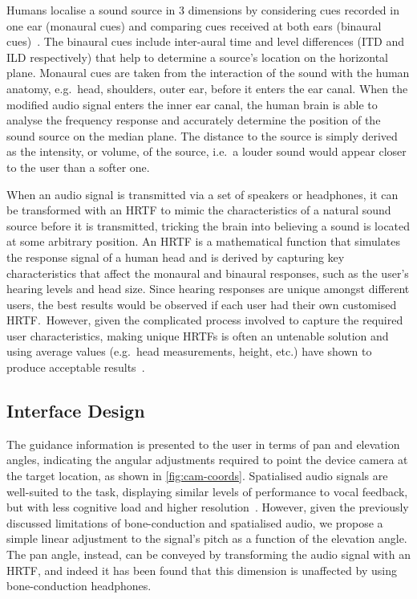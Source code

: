 \documentclass{llncs}
\begin{document}
Humans localise a sound source in 3 dimensions by considering cues recorded in one ear (monaural cues) and comparing cues received at both ears (binaural cues)~\cite{blauert1997spatial,blauert1969sound}.
The binaural cues include inter-aural time and level differences (ITD and ILD respectively) that help to determine a source's location on the horizontal plane.
Monaural cues are taken from the interaction of the sound with the human anatomy, e.g.\ head, shoulders, outer ear, before it enters the ear canal.
When the modified audio signal enters the inner ear canal, the human brain is able to analyse the frequency response and accurately determine the position of the sound source on the median plane. 
The distance to the source is simply derived as the intensity, or volume, of the source, i.e.\ a louder sound would appear closer to the user than a softer one. 

When an audio signal is transmitted via a set of speakers or headphones, it can be transformed with an HRTF to mimic the characteristics of a natural sound source before it is transmitted, tricking the brain into believing a sound is located at some arbitrary position.
An HRTF is a mathematical function that simulates the response signal of a human head and is derived by capturing key characteristics that affect the monaural and binaural responses, such as the user's hearing levels and head size.
Since hearing responses are unique amongst different users, the best results would be observed if each user had their own customised HRTF.\
However, given the complicated process involved to capture the required user characteristics, making unique HRTFs is often an untenable solution and using average values (e.g.\ head measurements, height, etc.) have shown to produce acceptable results~\cite{gardner1995hrtf}.

\subsection{Interface Design}

The guidance information is presented to the user in terms of pan and elevation angles, indicating the angular adjustments required to point the device camera at the target location, as shown in \cref{fig:cam-coords}.
Spatialised audio signals are well-suited to the task, displaying similar levels of performance to vocal feedback, but with less cognitive load and higher resolution~\cite{klatzky2006cognitive}.
However, given the previously discussed limitations of bone-conduction and spatialised audio, we propose a simple linear adjustment to the signal's pitch as a function of the elevation angle. 
The pan angle, instead, can be conveyed by transforming the audio signal with an HRTF, and indeed it has been found that this dimension is unaffected by using bone-conduction headphones\cite{schonstein2008comparison,macdonald2006spatial,stanley2006lateralization}. 
\end{document}
